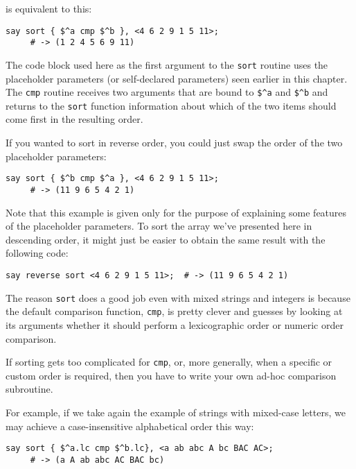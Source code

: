 is equivalent to this:

\begin{verbatim}
say sort { $^a cmp $^b }, <4 6 2 9 1 5 11>;
     # -> (1 2 4 5 6 9 11)
\end{verbatim}

The code block used here as the first argument to the 
{\tt sort} routine uses the placeholder 
parameters (or self-declared parameters) seen earlier 
in this chapter. The {\tt cmp} routine receives two 
arguments that are bound to \verb'$^a' and \verb'$^b' 
and returns to the \verb'sort' function information 
about which of the two items should come first in the 
resulting order.

If you wanted to sort in reverse order, you could just 
swap the order of the two placeholder parameters:

\begin{verbatim}
say sort { $^b cmp $^a }, <4 6 2 9 1 5 11>;
     # -> (11 9 6 5 4 2 1)
\end{verbatim}

Note that this example is given only for the purpose of 
explaining some features of the placeholder parameters. 
To sort the array we've presented here in descending order, 
it might just be easier to obtain the same result with the 
following code:

\begin{verbatim}
say reverse sort <4 6 2 9 1 5 11>;  # -> (11 9 6 5 4 2 1)
\end{verbatim}

The reason {\tt sort} does a good job even with mixed 
strings and integers is because the default comparison 
function, {\tt cmp}, is pretty clever and guesses by 
looking at its arguments whether it should perform 
a lexicographic order or numeric order comparison.

If sorting gets too complicated for {\tt cmp}, or, more 
generally, when a specific or custom order is required, 
then you have to write your own ad-hoc comparison 
subroutine.

For example, if we take again the example of strings 
with mixed-case letters, we may achieve a case-insensitive 
alphabetical order this way:

\begin{verbatim}
say sort { $^a.lc cmp $^b.lc}, <a ab abc A bc BAC AC>;
     # -> (a A ab abc AC BAC bc)
\end{verbatim}

